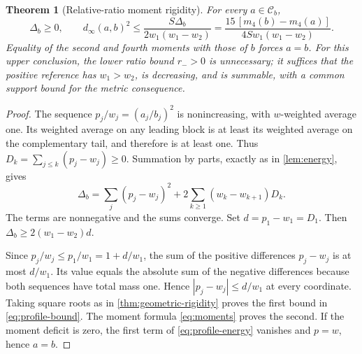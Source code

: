 \documentclass[11pt,a4paper]{article}
\numberwithin{equation}{section}
\newtheorem{theorem}{Theorem}[section]
\theoremstyle{definition}
\theoremstyle{remark}
\newcommand{\C}{\mathcal C}
\begin{document}
\begin{theorem}[Relative-ratio moment rigidity]
\label{thm:profile-rigidity}
For every $a\in\C_b$,
\begin{equation}
 \Delta_b\ge0,\qquad
 d_\infty(a,b)^2
 \le\frac{S\Delta_b}{2w_1(w_1-w_2)}
 =\frac{15\,[m_4(b)-m_4(a)]}{4S w_1(w_1-w_2)}.
 \label{eq:profile-bound}
\end{equation}
Equality of the second and fourth moments with those of $b$ forces $a=b$.
For this upper conclusion, the lower ratio bound $r_->0$ is unnecessary;
it suffices that the positive reference has $w_1>w_2$, is decreasing, and
is summable, with a common support bound for the metric consequence.
\end{theorem}
\begin{proof}
The sequence $p_j/w_j=(a_j/b_j)^2$ is nonincreasing, with $w$-weighted
average one. Its weighted average on any leading block is at least its
weighted average on the complementary tail, and therefore is at least one.
Thus $D_k=\sum_{j\le k}(p_j-w_j)\ge0$. Summation by parts, exactly as
in \cref{lem:energy}, gives
\begin{equation}
 \Delta_b=\sum_j(p_j-w_j)^2
         +2\sum_{k\ge1}(w_k-w_{k+1})D_k.
 \label{eq:profile-energy}
\end{equation}
The terms are nonnegative and the sums converge. Set $d=p_1-w_1=D_1$.
Then $\Delta_b\ge2(w_1-w_2)d$.

Since $p_j/w_j\le p_1/w_1=1+d/w_1$, the sum of the positive differences
$p_j-w_j$ is at most $d/w_1$. Its value equals the absolute sum of the
negative differences because both sequences have total mass one. Hence
$|p_j-w_j|\le d/w_1$ at every coordinate. Taking square roots as in
\cref{thm:geometric-rigidity} proves the first bound in
\eqref{eq:profile-bound}. The moment formula \eqref{eq:moments} proves
the second. If the moment deficit is zero, the first term of
\eqref{eq:profile-energy} vanishes and $p=w$, hence $a=b$.
\end{proof}
\end{document}
